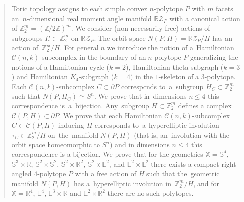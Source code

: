 \documentclass[12pt]{amsart}
\theoremstyle{definition}
\theoremstyle{remark}
\begin{document}




\begin{abstract}
Toric topology assigns to each simple  convex $n$-polytope $P$ with $m$ facets an~$n$-dimensional real moment angle 
manifold $\mathbb R\mathcal{Z}_P$ with a canonical action of $\mathbb Z_2^m=(\mathbb Z/2\mathbb Z)^m$.
We consider  (non-necessarily free) actions of subgroups $H\subset \mathbb Z_2^m$ 
on  $\mathbb R\mathcal{Z}_P$.  
The orbit space $N(P,H)=\mathbb R\mathcal{Z}_P/H$ has an action of~$\mathbb Z_2^m/H$.
For general $n$ we introduce the notion of a~Hamiltonian $\mathcal{C}(n,k)$-subcomplex in the boundary of 
an $n$-polytope $P$ generalizing the notions of a Hamiltonian cycle  ($k=2$), 
Hamiltonian  theta-subgraph ($k=3$) and Hamiltonian $K_4$-subgraph ($k=4)$ in the $1$-skeleton of a $3$-polytope.
Each $\mathcal{C}(n,k)$-subcomplex $C\subset \partial P$ corresponds to~a~subgroup  
$H_C\subset\mathbb Z_2^m$ such that $N(P,H_C)\simeq S^n$. We prove that in~dimensions $n\leqslant 4$ this
correspondence is~a~bijection. Any~subgroup $H\subset \mathbb Z_2^m$ defines a complex $\mathcal{C}(P,H)\subset \partial P$. 
We prove that each Hamiltonian $\mathcal{C}(n,k)$-subcomplex $C\subset \mathcal{C}(P,H)$ inducing $H$
corresponds to~a~hyperelliptic involution $\tau_C\in\mathbb Z_2^m/H$ on~the~manifold $N(P,H)$ 
(that is, an~involution with the orbit space homeomorphic to $S^n$) 
and in dimensions $n\leqslant 4$ this correspondence is a bijection.
We prove that for the geometries $\mathbb X= \mathbb S^4$, $\mathbb S^3\times\mathbb R$, $\mathbb S^2\times \mathbb S^2$, 
$\mathbb S^2\times \mathbb R^2$, $\mathbb S^2\times \mathbb L^2$, and $\mathbb L^2\times \mathbb L^2$
there exists a compact right-angled $4$-polytope $P$ with a free action of $H$
such that the~geometric manifold  $N(P,H)$ has a~hyperelliptic involution in~$\mathbb Z_2^m/H$, 
and for $\mathbb X=\mathbb R^4$, $\mathbb L^4$, $\mathbb L^3\times \mathbb R$ and $\mathbb L^2\times \mathbb R^2$ 
there are no such polytopes.
\end{abstract}
\maketitle
\tableofcontents
\setcounter{section}{0}
\end{document}
